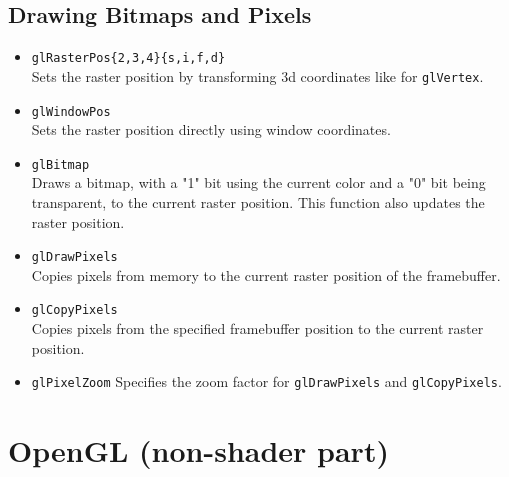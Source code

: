\documentclass[12pt]{article}
\begin{document}
\subsection{Drawing Bitmaps and Pixels}
\begin{itemize}
\item \texttt{glRasterPos\{2,3,4\}\{s,i,f,d\}} \\
	Sets the raster position by transforming 3d coordinates like for \texttt{glVertex}.
\item \texttt{glWindowPos} \\
	Sets the raster position directly using window coordinates.
\item \texttt{glBitmap} \\
	Draws a bitmap, with a "1" bit using the current color and a "0" bit being transparent, to the current raster position.
	This function also updates the raster position.
\item \texttt{glDrawPixels} \\
	Copies pixels from memory to the current raster position of the framebuffer.
\item \texttt{glCopyPixels} \\
	Copies pixels from the specified framebuffer position to the current raster position.
\item \texttt{glPixelZoom}
	Specifies the zoom factor for \texttt{glDrawPixels} and \texttt{glCopyPixels}.
\end{itemize}





\section{OpenGL (non-shader part)}
\end{document}
